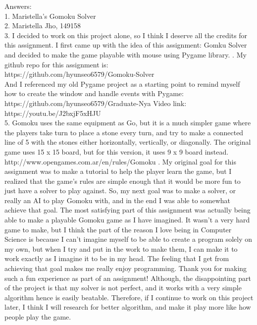 \documentclass[a4paper]{article}
\begin{document}
\noindent Answers:\\
1.	Maristella’s Gomoku Solver\\
2.	Maristella Jho, 149158\\
3.	I decided to work on this project alone, so I think I deserve all the credits for this assignment. I first came up with the idea of this assignment: Gomku Solver and decided to make the game playable with mouse using Pygame library.
.	My github repo for this assignment is: \\
https://github.com/hyunseo6579/Gomoku-Solver\\
And I referenced my old Pygame project as a starting point to remind myself how to create the window and handle events with Pygame:\\https://github.com/hyunseo6579/Graduate-Nya
\newline Video link: https://youtu.be/J2bxjF5xHJU \\
5.	Gomoku uses the same equipment as Go, but it is a much simpler game where the players take turn to place a stone every turn, and try to make a connected line of 5 with the stones either horizontally, vertically, or diagonally. The original game uses 15 x 15 board, but for this version, it uses 9 x 9 board instead.
http://www.opengames.com.ar/en/rules/Gomoku
.	My original goal for this assignment was to make a tutorial to help the player learn the game, but I realized that the game’s rules are simple enough that it would be more fun to just have a solver to play against. So, my next goal was to make a solver, or really an AI to play Gomoku with, and in the end I was able to somewhat achieve that goal. The most satisfying part of this assignment was actually being able to make a playable Gomoku game as I have imagined. It wasn’t a very hard game to make, but I think the part of the reason I love being in Computer Science is because I can’t imagine myself to be able to create a program solely on my own, but when I try and put in the work to make them, I can make it to work exactly as I imagine it to be in my head. The feeling that I get from achieving that goal makes me really enjoy programming. Thank you for making such a fun experience as part of an assignment! Although, the disappointing part of the project is that my solver is not perfect, and it works with a very simple algorithm hence is easily beatable. Therefore, if I continue to work on this project later, I think I will research for better algorithm, and make it play more like how people play the game.
\end{document}
